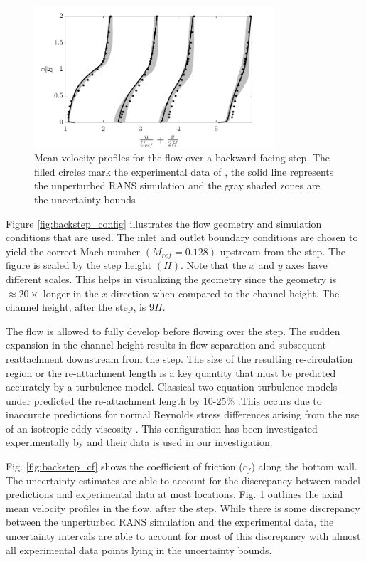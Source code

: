 \begin{figure}
\centering
\includegraphics[width=0.8\textwidth]{code/image_gen/backstep/images/backstep_vel_prof.png}
\caption{Mean velocity profiles for the flow over a backward facing step. The filled circles mark the experimental data of \cite{driver1985}, the solid line represents the unperturbed RANS simulation and the gray shaded zones are the uncertainty bounds\label{fig:backstep_vel_prof}}
\end{figure}

Figure \ref{fig:backstep_config} illustrates the flow geometry and simulation conditions that are used. The inlet and outlet boundary conditions are chosen to yield the correct Mach number $\left ( M_{ref} = 0.128 \right )$ upstream from the step. The figure is scaled by the step height $\left ( H \right ) $. Note that the $x$ and $y$ axes have different scales. This helps in visualizing the geometry since the geometry is $\approx 20\times$ longer in the $x$ direction when compared to the channel height. The channel height, after the step, is $9H$. 

The flow is allowed to fully develop before flowing over the step. The sudden expansion in the channel height results in flow separation and subsequent reattachment downstream from the step. The size of the resulting re-circulation region or the re-attachment length is a key quantity that must be predicted accurately by a turbulence model. Classical two-equation turbulence models under predicted the re-attachment length by 10-25\% \cite{thangam1991}.This occurs due to inaccurate predictions for normal Reynolds stress differences arising from the use of an isotropic eddy viscosity \cite{thangam1991}. This configuration has been investigated experimentally by \cite{driver1985} and their data is used in our investigation.

Fig. \ref{fig:backstep_cf} shows the coefficient of friction ($c_f$) along the bottom wall. The uncertainty estimates are able to account for the discrepancy between model predictions and experimental data at most locations. Fig. \ref{fig:backstep_vel_prof} outlines the axial mean velocity profiles in the flow, after the step. While there is some discrepancy between the unperturbed RANS simulation and the experimental data, the uncertainty intervals are able to account for most of this discrepancy with almost all experimental data points lying in the uncertainty bounds. 

